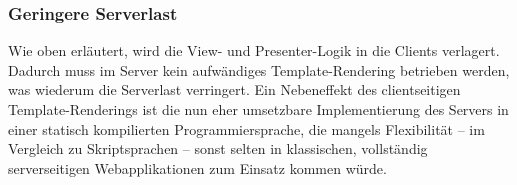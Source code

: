 \subsubsection{Geringere Serverlast}
\label{sssec:eaa_geringere_serverlast}

Wie oben erläutert, wird die View- und Presenter-Logik in die Clients verlagert.
Dadurch muss im Server kein aufwändiges Template-Rendering betrieben werden, was
wiederum die Serverlast verringert.  Ein Nebeneffekt des clientseitigen
Template-Renderings ist die nun eher umsetzbare Implementierung des
Servers in einer statisch kompilierten Programmiersprache, die mangels
Flexibilität -- im Vergleich zu Skriptsprachen -- sonst selten in klassischen,
vollständig serverseitigen Webapplikationen zum Einsatz kommen würde.
